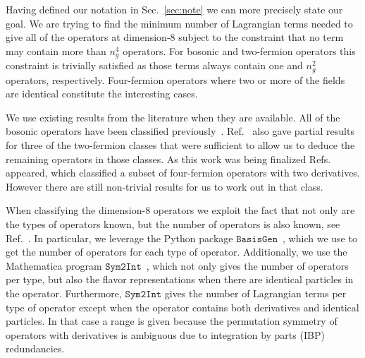 Having defined our notation in Sec.~\ref{sec:note} we can more precisely state our goal.
We are trying to find the minimum number of Lagrangian terms needed to give all of the operators at dimension-8 subject to the constraint that no term may contain more than $n_g^4$ operators.
For bosonic and two-fermion operators this constraint is trivially satisfied as those terms always contain one and $n_g^2$ operators, respectively.
Four-fermion operators where two or more of the fields are identical constitute the interesting cases.

We use existing results from the literature when they are available.
All of the bosonic operators have been classified previously~\cite{Morozov:1985ef, Hays:2018zze, Remmen:2019cyz}.
Ref.~\cite{Hays:2018zze} also gave partial results for three of the two-fermion classes that were sufficient to allow us to deduce the remaining operators in those classes.
As this work was being finalized Refs.~\cite{Alioli:2020kez, Remmen:2020vts} appeared, which classified a subset of four-fermion operators with two derivatives.
However there are still non-trivial results for us to work out in that class.

When classifying the dimension-8 operators we exploit the fact that not only are the types of operators known, but the number of operators is also known, see Ref.~\cite{Henning:2015alf}.
In particular, we leverage the Python package $\mathtt{BasisGen}$~\cite{Criado:2019ugp}, which we use to get the number of operators for each type of operator.
Additionally, we use the Mathematica program $\mathtt{Sym2Int}$~\cite{Fonseca:2017lem}, which not only gives the number of operators per type, but also the flavor representations when there are identical particles in the operator.
Furthermore, $\mathtt{Sym2Int}$ gives the number of Lagrangian terms per type of operator except when the operator contains both derivatives and identical particles. 
In that case a range is given because the permutation symmetry of operators with derivatives is ambiguous due to integration by parts (IBP) redundancies.

